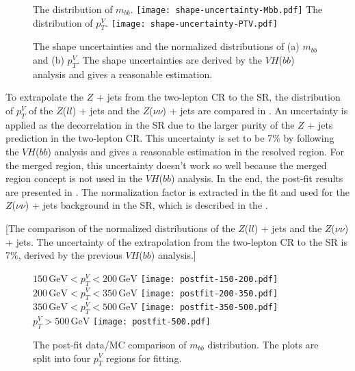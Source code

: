 \documentclass[class=NTHU_thesis, crop=false]{standalone}
\begin{document}
\begin{figure}[!hbt]
	\centering
	\subcaptionbox
	{The distribution of $m_{bb}$.
		\label{fig:shape-uncertainty-fig1}}
		{\texttt{[image: shape-uncertainty-Mbb.pdf]}}
	\vspace{\baselineskip}
	\subcaptionbox
	{The distribution of $p^V_T$.
		\label{fig:shape-uncertainty-fig2}}
		{\texttt{[image: shape-uncertainty-PTV.pdf]}}
	\caption{The shape uncertainties and the normalized distributions of (a) $m_{bb}$ and (b) $p^V_T$. The shape uncertainties are derived by the $VH$($bb$) analysis and gives a reasonable estimation.}
	\label{fig:shape-uncertainty}
\end{figure}

To extrapolate the $Z$ + jets from the two-lepton CR to the SR, the distribution of $p^V_T$ of the $Z$($ll$) + jets and the $Z$($\nu\nu$) + jets are compared in . An uncertainty is applied as the decorrelation in the SR due to the larger purity of the $Z$ + jets prediction in the two-lepton CR. This uncertainty is set to be 7\% by following the $VH$($bb$) analysis \cite{ATLAS-CONF-2018-036} and gives a reasonable estimation in the resolved region. For the merged region, this uncertainty doesn't work so well because the merged region concept is not used in the $VH$($bb$) analysis. In the end, the post-fit results are presented in . The normalization factor is extracted in the fit and used for the $Z$($\nu\nu$) + jets background in the SR, which is described in the .

[The comparison of the normalized distributions of the $Z$($ll$) + jets and the $Z$($\nu\nu$) + jets. The uncertainty of the extrapolation from the two-lepton CR to the SR is 7\%, derived by the previous $VH$($bb$) analysis.]

\begin{figure}[!hbt]
	\captionsetup[subfigure]{labelformat=empty}
	\centering
	\subcaptionbox
	{$150\, \mathrm{GeV} < p^V_T < 200\, \mathrm{GeV}$
		\label{fig:2-lep-postfit-fig1}}
		{\texttt{[image: postfit-150-200.pdf]}}
	\subcaptionbox
	{$200\, \mathrm{GeV} < p^V_T < 350\, \mathrm{GeV}$
		\label{fig:2-lep-postfit-fig2}}
		{\texttt{[image: postfit-200-350.pdf]}}
	\vspace{\baselineskip}
	\subcaptionbox
	{$350\, \mathrm{GeV} < p^V_T < 500\, \mathrm{GeV}$
		\label{fig:2-lep-postfit-fig3}}
		{\texttt{[image: postfit-350-500.pdf]}}
	\subcaptionbox
	{$p^V_T > 500\, \mathrm{GeV}$
		\label{fig:2-lep-postfit-fig4}}
		{\texttt{[image: postfit-500.pdf]}}
	\caption{The post-fit data/MC comparison of $m_{bb}$ distribution. The plots are split into four $p^V_T$ regions for fitting.}
	\label{fig:2-lep-postfit}
\end{figure}
\end{document}
